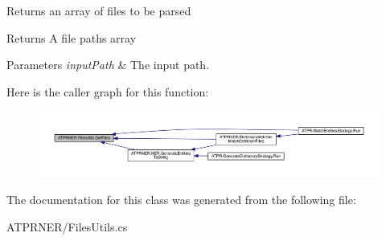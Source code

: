 Returns an array of files to be parsed 

\begin{DoxyReturn}{Returns}
A file paths array
\end{DoxyReturn}

\begin{DoxyParams}{Parameters}
{\em input\+Path} & The input path.\\
\hline
\end{DoxyParams}
Here is the caller graph for this function\+:
\nopagebreak
\begin{figure}[H]
\begin{center}
\leavevmode
\includegraphics[width=350pt]{d5/de9/class_a_t_p_r_n_e_r_1_1_files_utils_aa9ee9ca4b22ddc16322bff7ea1d979bb_icgraph}
\end{center}
\end{figure}


The documentation for this class was generated from the following file\+:\begin{DoxyCompactItemize}
\item 
A\+T\+P\+R\+N\+E\+R/Files\+Utils.\+cs\end{DoxyCompactItemize}
